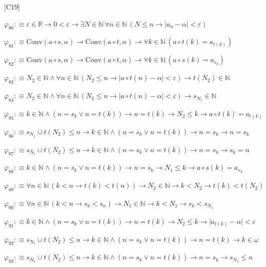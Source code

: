 \begin{fullproof}{[C19]}
\begin{abbrevlist}
\item $\varphi_{80} :\equiv \varepsilon \in \mathbb{R} \to 0 < \varepsilon \to \exists N \in \mathbb{N}\,\forall n \in \mathbb{N}\,(N \leq n \to \lvert a_{n} - \alpha \rvert < \varepsilon)$
\item $\varphi_{81} :\equiv \mathrm{Conv}(a \circ s,\alpha) \to \mathrm{Conv}(a \circ t,\alpha) \to \forall k \in \mathbb{N}\,(a \circ t(k) = a_{t(k)})$
\item $\varphi_{82} :\equiv \mathrm{Conv}(a \circ s,\alpha) \to \mathrm{Conv}(a \circ t,\alpha) \to \forall k \in \mathbb{N}\,(a \circ s(k) = a_{s_{k}})$
\item $\varphi_{83} :\equiv N_{2} \in \mathbb{N} \land \forall n \in \mathbb{N}\,(N_{2} \leq n \to \lvert a \circ t(n) - \alpha \rvert < \varepsilon) \to t(N_{2}) \in \mathbb{N}$
\item $\varphi_{84} :\equiv N_{2} \in \mathbb{N} \land \forall n \in \mathbb{N}\,(N_{2} \leq n \to \lvert a \circ t(n) - \alpha \rvert < \varepsilon) \to s_{N_{1}} \in \mathbb{N}$
\item $\varphi_{85} :\equiv k \in \mathbb{N} \land (n = s_{k} \lor n = t(k)) \to n = t(k) \to N_{2} \leq k \to a \circ t(k) = a_{t(k)}$
\item $\varphi_{86} :\equiv s_{N_{1}} \cup t(N_{2}) \leq n \to k \in \mathbb{N} \land (n = s_{k} \lor n = t(k)) \to n = s_{k} \to n = s_{k}$
\item $\varphi_{87} :\equiv s_{N_{1}} \cup t(N_{2}) \leq n \to k \in \mathbb{N} \land (n = s_{k} \lor n = t(k)) \to n = s_{k} \to s_{k} = n$
\item $\varphi_{88} :\equiv k \in \mathbb{N} \land (n = s_{k} \lor n = t(k)) \to n = s_{k} \to N_{1} \leq k \to a \circ s(k) = a_{s_{k}}$
\item $\varphi_{89} :\equiv \forall n \in \mathbb{N}\,(k < n \to t(k) < t(n)) \to N_{2} \in \mathbb{N} \to k < N_{2} \to t(k) < t(N_{2})$
\item $\varphi_{90} :\equiv \forall n \in \mathbb{N}\,(k < n \to s_{k} < s_{n}) \to N_{1} \in \mathbb{N} \to k < N_{1} \to s_{k} < s_{N_{1}}$
\item $\varphi_{91} :\equiv k \in \mathbb{N} \land (n = s_{k} \lor n = t(k)) \to n = t(k) \to N_{2} \leq k \to \lvert a_{t(k)} - \alpha \rvert < \varepsilon$
\item $\varphi_{92} :\equiv s_{N_{1}} \cup t(N_{2}) \leq n \to k \in \mathbb{N} \land (n = s_{k} \lor n = t(k)) \to n = t(k) \to k \in \omega$
\item $\varphi_{93} :\equiv s_{N_{1}} \cup t(N_{2}) \leq n \to k \in \mathbb{N} \land (n = s_{k} \lor n = t(k)) \to n = s_{k} \to s_{N_{1}} \leq n$

\end{abbrevlist}
\end{fullproof}
